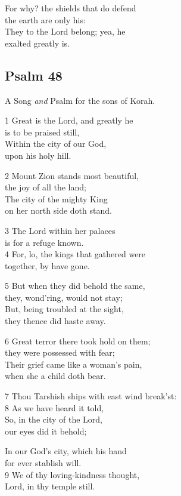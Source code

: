 \begin{multicols}{3}
For why? the shields that do defend\\
the earth are only his:\\
They to the Lord belong; yea, he\\
exalted greatly is.

\begin{center}
\quad{}\quad{}
\end{center}

\subsection*{Psalm 48}

A Song \emph{and} Psalm for the sons of Korah.

1 Great is the Lord, and greatly he\\
is to be praised still,\\
Within the city of our God,\\
upon his holy hill.

2 Mount Zion stands most beautiful,\\
the joy of all the land;\\
The city of the mighty King\\
on her north side doth stand.

3 The Lord within her palaces\\
is for a refuge known.\\
4 For, lo, the kings that gathered were\\
together, by have gone.

5 But when they did behold the same,\\
they, wond’ring, would not stay;\\
But, being troubled at the sight,\\
they thence did haste away.

6 Great terror there took hold on them;\\
they were possessed with fear;\\
Their grief came like a woman’s pain,\\
when she a child doth bear.

7 Thou Tarshish ships with east wind break’st:\\
8 As we have heard it told,\\
So, in the city of the Lord,\\
our eyes did it behold;

In our God’s city, which his hand\\
for ever stablish will.\\
9 We of thy loving-kindness thought,\\
Lord, in thy temple still.


\end{multicols}
